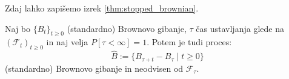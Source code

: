 \documentclass[11pt]{article}
\newcommand{\f}{\mathcal{F}}
{\theoremstyle{plain}
\newtheorem{izrek}{izrek}[section]
}
{\theoremstyle{definition}
\newtheorem{definicija}[izrek]{Definicija}}
\begin{document}
    Zdaj lahko zapišemo izrek \ref{thm:stopped_brownian}. %
    

\begin{izrek}
    \label{thm:stopped_brownian}
        Naj bo \(\{B_t\}_{t \geq 0}\) (standardno) Brownovo gibanje, \(\tau\) čas ustavljanja glede na 
        \((\f_t)_{t \ge 0}\) in naj velja \(P[\tau < \infty ]=1\).
        Potem je tudi proces:
        \[
        \hat{B} := \{B_{\tau+t} - B_\tau \mid t \geq 0\}
        \]
        (standardno) Brownovo gibanje in neodvisen od \(\f_{\tau}\).
\end{izrek}


    
\end{document}
